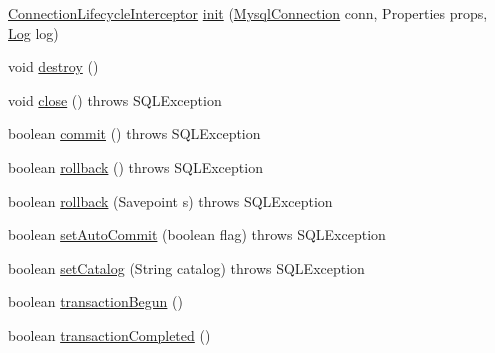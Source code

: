 \begin{DoxyCompactItemize}
\item 
\mbox{\hyperlink{interfacecom_1_1mysql_1_1cj_1_1jdbc_1_1interceptors_1_1_connection_lifecycle_interceptor}{Connection\+Lifecycle\+Interceptor}} \mbox{\hyperlink{interfacecom_1_1mysql_1_1cj_1_1jdbc_1_1interceptors_1_1_connection_lifecycle_interceptor_ab4de7e32506946459d6b3e68c5d0ea6b}{init}} (\mbox{\hyperlink{interfacecom_1_1mysql_1_1cj_1_1_mysql_connection}{Mysql\+Connection}} conn, Properties props, \mbox{\hyperlink{interfacecom_1_1mysql_1_1cj_1_1log_1_1_log}{Log}} log)
\item 
void \mbox{\hyperlink{interfacecom_1_1mysql_1_1cj_1_1jdbc_1_1interceptors_1_1_connection_lifecycle_interceptor_a33d706a19850fdc02c89b2e5f70cb2f5}{destroy}} ()
\item 
void \mbox{\hyperlink{interfacecom_1_1mysql_1_1cj_1_1jdbc_1_1interceptors_1_1_connection_lifecycle_interceptor_abb75c2ea1017850c63b6783a657cec4c}{close}} ()  throws S\+Q\+L\+Exception
\item 
boolean \mbox{\hyperlink{interfacecom_1_1mysql_1_1cj_1_1jdbc_1_1interceptors_1_1_connection_lifecycle_interceptor_a7415bbf8cf6eefbbbd22f710e7f694f9}{commit}} ()  throws S\+Q\+L\+Exception
\item 
boolean \mbox{\hyperlink{interfacecom_1_1mysql_1_1cj_1_1jdbc_1_1interceptors_1_1_connection_lifecycle_interceptor_a0659ae7aff8c74e8236b82deccee4fed}{rollback}} ()  throws S\+Q\+L\+Exception
\item 
boolean \mbox{\hyperlink{interfacecom_1_1mysql_1_1cj_1_1jdbc_1_1interceptors_1_1_connection_lifecycle_interceptor_a1f2f30024dbf49bcfde29842f5e2d677}{rollback}} (Savepoint s)  throws S\+Q\+L\+Exception
\item 
boolean \mbox{\hyperlink{interfacecom_1_1mysql_1_1cj_1_1jdbc_1_1interceptors_1_1_connection_lifecycle_interceptor_a59c4f11d95ed73bad5c35c6741c03197}{set\+Auto\+Commit}} (boolean flag)  throws S\+Q\+L\+Exception
\item 
boolean \mbox{\hyperlink{interfacecom_1_1mysql_1_1cj_1_1jdbc_1_1interceptors_1_1_connection_lifecycle_interceptor_af094892c143ea900543d639bfaf1b258}{set\+Catalog}} (String catalog)  throws S\+Q\+L\+Exception
\item 
boolean \mbox{\hyperlink{interfacecom_1_1mysql_1_1cj_1_1jdbc_1_1interceptors_1_1_connection_lifecycle_interceptor_a8786e9ce2e821f0f59bffc9343ffbb7c}{transaction\+Begun}} ()
\item 
boolean \mbox{\hyperlink{interfacecom_1_1mysql_1_1cj_1_1jdbc_1_1interceptors_1_1_connection_lifecycle_interceptor_a53811dd190160d999a9e217cf9208a84}{transaction\+Completed}} ()
\end{DoxyCompactItemize}


